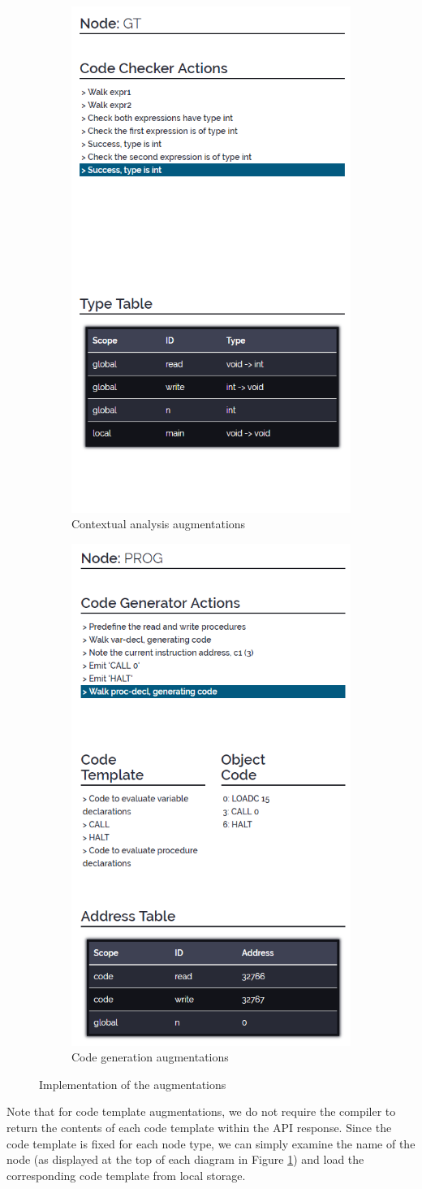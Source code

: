 \documentclass{l4proj}
\begin{document}
\begin{figure}[h]
	\centering
	\begin{subfigure}[b]{.5\textwidth}
		\centering
		\includegraphics[width=.4\linewidth]{images/implaugs1.PNG}
		\caption{Contextual analysis augmentations}
	\end{subfigure}%
	\begin{subfigure}[b]{.5\textwidth}
		\centering
		\includegraphics[width=.4\linewidth]{images/implaugs2.PNG}
		\caption{Code generation augmentations}
	\end{subfigure}
	\caption{Implementation of the augmentations}
	\label{fig:implaugs}	
\end{figure}

Note that for code template augmentations, we do not require the compiler to return the contents of each code template within the API response. Since the code template is fixed for each node type, we can simply examine the name of the node (as displayed at the top of each diagram in Figure \ref{fig:implaugs}) and load the corresponding code template from local storage.
\end{document}
